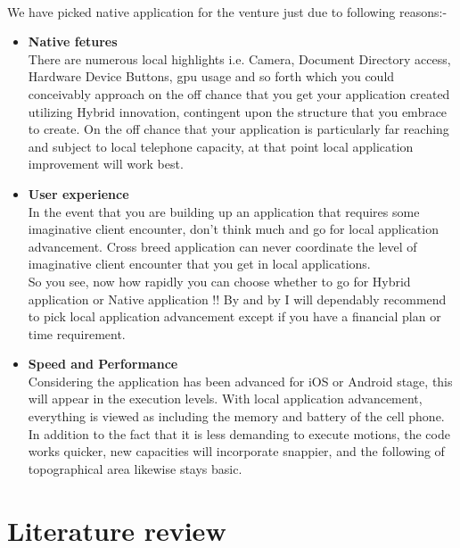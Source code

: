 \\We have picked native application for the venture just due to following reasons:-

\begin{itemize}
  \item \textbf{Native fetures} \\ 
  There are numerous local highlights i.e. Camera, Document Directory access, Hardware Device Buttons, \gls{gpu} usage and so forth which you could conceivably approach on the off chance that you get your application created utilizing Hybrid innovation, contingent upon the structure that you embrace to create. On the off chance that your application is particularly far reaching and subject to local telephone capacity, at that point local application improvement will work best.
  
  \item \textbf{User experience} \\ 
  In the event that you are building up an application that requires some imaginative client encounter, don't think much and go for local application advancement. Cross breed application can never coordinate the level of imaginative client encounter that you get in local applications. \\
  So you see, now how rapidly you can choose whether to go for Hybrid application or Native application !! By and by I will dependably recommend to pick local application advancement except if you have a financial plan or time requirement.
  
  \item \textbf{Speed and Performance} \\
 Considering the application has been advanced for iOS or Android stage, this will appear in the execution levels. With local application advancement, everything is viewed as including the memory and battery of the cell phone. In addition to the fact that it is less demanding to execute motions, the code works quicker, new capacities will incorporate snappier, and the following of topographical area likewise stays basic.
 
\end{itemize}

\section{Literature review}